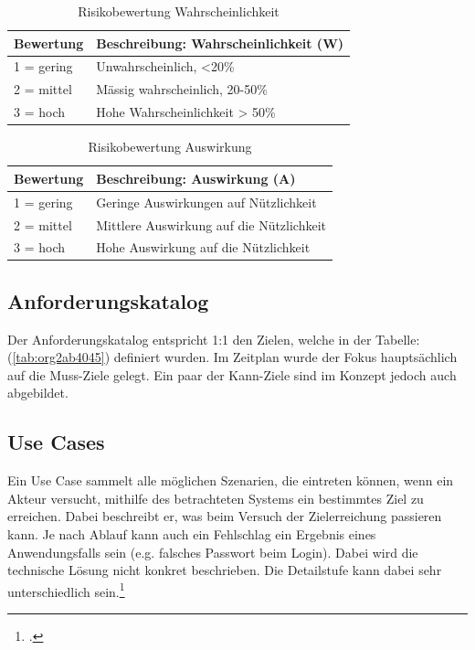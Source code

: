 \begin{table}
\centering
\begin{tabular}{l|l}
\textbf{Bewertung} & \textbf{Beschreibung: Wahrscheinlichkeit (W)}\\
\hline
1 = gering & Unwahrscheinlich, <20\%\\
2 = mittel & Mässig wahrscheinlich, 20-50\%\\
3 = hoch & Hohe Wahrscheinlichkeit > 50\%\\
\end{tabular}
\caption{\label{tab:orgc24b878}
Risikobewertung Wahrscheinlichkeit}

\end{table}
\begin{table}
\centering
\begin{tabular}{l|l}
\textbf{Bewertung} & \textbf{Beschreibung: Auswirkung (A)}\\
\hline
1 = gering & Geringe Auswirkungen auf Nützlichkeit\\
2 = mittel & Mittlere Auswirkung auf die Nützlichkeit\\
3 = hoch & Hohe Auswirkung auf die Nützlichkeit\\
\end{tabular}
\caption{\label{tab:org8a27a35}
Risikobewertung Auswirkung}

\end{table}
\pagebreak
\subsection{Anforderungskatalog}
\label{sec:org90be6e5}

Der Anforderungskatalog entspricht 1:1 den Zielen, welche in der
Tabelle:(\ref{tab:org2ab4045}) definiert wurden. Im Zeitplan wurde der Fokus
hauptsächlich auf die Muss-Ziele gelegt. Ein paar der Kann-Ziele sind im
Konzept jedoch auch abgebildet.

\subsection{Use Cases}
\label{sec:orgfd94eff}

Ein Use Case sammelt alle möglichen Szenarien, die eintreten können,
wenn ein Akteur versucht, mithilfe des betrachteten Systems ein
bestimmtes Ziel zu erreichen. Dabei beschreibt er, was beim Versuch der
Zielerreichung passieren kann. Je nach Ablauf kann auch ein Fehlschlag
ein Ergebnis eines Anwendungsfalls sein (e.g. falsches Passwort beim
Login). Dabei wird die technische Lösung nicht konkret beschrieben.
Die Detailstufe kann dabei sehr unterschiedlich sein.\footcite{usecase}

